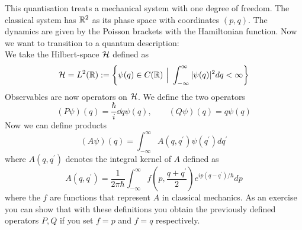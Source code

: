 \begin{example}
  This quantisation treats a mechanical system with one degree of freedom. The classical system has $\mathbb{R}^2$ as its phase space with coordinates $(p,q)$. The dynamics are given by the Poisson brackets with the Hamiltonian function. Now we want to transition to a quantum description:\\

  We take the Hilbert-space ${\mathcal{H}}$ defined as
  \begin{equation}{\mathcal{H}} = L^2(\mathbb{R}) := \left\{ \psi(q) \in C(\mathbb{R}) \ \Big| \ \int_{-\infty}^\infty |\psi(q)|^2 dq < \infty  \right\}\end{equation}
  Observables are now operators on ${\mathcal{H}}$. We define the two operators
  \begin{equation}(P\psi)(q) = \frac{\hbar}{i} \dd{}{q} \psi(q), \quad \quad (Q\psi)(q) = q \psi(q)\end{equation}
  Now we can define products
  \begin{equation}(A\psi)(q) = \int_{-\infty}^\infty A(q,q^\prime) \psi(q^\prime) dq^\prime\end{equation}
  where $A(q,q^\prime)$ denotes the integral kernel of $A$ defined as
  \begin{equation}A(q,q^\prime) = \frac{1}{2 \pi \hbar} \int_{-\infty}^\infty f\left( p, \frac{q+q^\prime}{2} \right) e^{ip(q-q^\prime)/\hbar} dp\end{equation}
  where the $f$ are functions that represent $A$ in classical mechanics. As an exercise you can show that with these definitions you obtain the previously defined operators $P,Q$ if you set $f=p$ and $f=q$ respectively.\\


\end{example}
